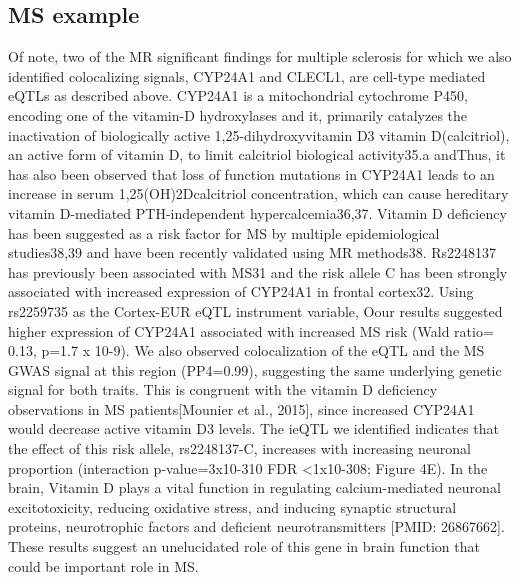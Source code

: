 \subsection{MS example}
Of note, two of the MR significant findings for multiple sclerosis for which we also identified colocalizing signals, CYP24A1 and CLECL1, are cell-type mediated eQTLs as described above. CYP24A1 is a mitochondrial cytochrome P450, encoding one of the vitamin-D hydroxylases and it, primarily catalyzes the inactivation of biologically active 1,25-dihydroxyvitamin D3 vitamin D(calcitriol), an active form of vitamin D, to limit calcitriol biological activity35.a andThus, it has also been observed that loss of function mutations in CYP24A1 leads to an increase in serum 1,25(OH)2Dcalcitriol concentration, which can cause hereditary vitamin D-mediated PTH-independent hypercalcemia36,37. Vitamin D deficiency has been suggested as a risk factor for MS by multiple epidemiological studies38,39 and have been recently validated using MR methods38. Rs2248137 has previously been associated with MS31 and the risk allele C has been strongly associated with increased expression of CYP24A1 in frontal cortex32. Using rs2259735 as the Cortex-EUR eQTL instrument variable, Oour results suggested higher expression of CYP24A1 associated with increased MS risk (Wald ratio= 0.13, p=1.7 x 10-9). We also observed colocalization of the eQTL and the MS GWAS signal at this region (PP4=0.99), suggesting the same underlying genetic signal for both traits. This is congruent with the vitamin D deficiency observations in MS patients[Mounier et al., 2015], since increased CYP24A1 would decrease active vitamin D3 levels. The ieQTL we identified indicates that the effect of this risk allele, rs2248137-C, increases with increasing neuronal proportion (interaction p-value=3x10-310 FDR <1x10-308; Figure 4E). In the brain, Vitamin D plays a vital function in regulating calcium-mediated neuronal excitotoxicity, reducing oxidative stress, and inducing synaptic structural proteins, neurotrophic factors and deficient neurotransmitters [PMID: 26867662]. These results suggest an unelucidated role of this gene in brain function that could be important role in MS.   

